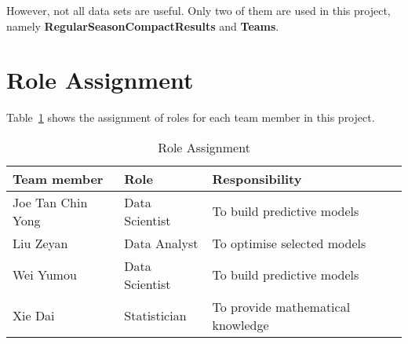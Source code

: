 However, not all data sets are useful. Only two of them are used in this project, namely \textbf{RegularSeasonCompactResults} and \textbf{Teams}. 

\section{Role Assignment}
Table~\ref{Ta:role_assgn} shows the assignment of roles for each team member in this project. 
\begin{table}[h!]
\centering
\begin{tabular}{ | l | l | l | }
\hline
\textbf{Team member} & \textbf{Role} & \textbf{Responsibility} \\ \hline
Joe Tan Chin Yong & Data Scientist & To build predictive models \\ \hline
Liu Zeyan & Data Analyst & To optimise selected models \\ \hline
Wei Yumou & Data Scientist & To build predictive models \\ \hline
Xie Dai & Statistician & To provide mathematical knowledge  \\ \hline
\end{tabular}
\caption{Role Assignment}\label{Ta:role_assgn}
\end{table}


%
%
%
%
